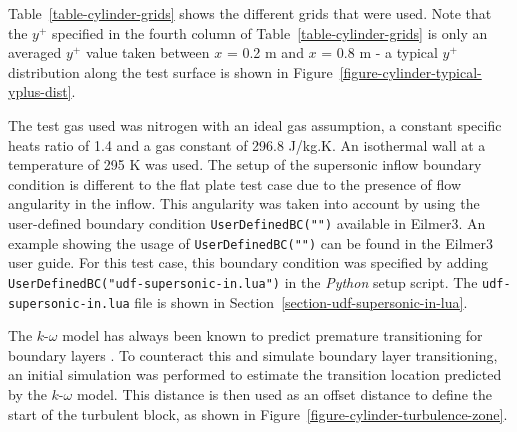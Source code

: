 Table~\ref{table-cylinder-grids} shows the different grids that were used.
Note that the $y^+$ specified in the fourth column of Table~\ref{table-cylinder-grids}
is only an averaged $y^+$ value taken between $x$ = 0.2 m and $x$ = 0.8 m
- a typical $y^+$ distribution along the test surface is shown in 
Figure~\ref{figure-cylinder-typical-yplus-dist}.

The test gas used was nitrogen with an ideal gas assumption, a 
constant specific heats ratio of 1.4 and a gas constant of 296.8 J/kg.K. 
An isothermal wall at a temperature of 295 K was used. 
The setup of the supersonic inflow boundary condition is different
to the flat plate test case due to the presence of flow angularity
in the inflow. This angularity was taken into account by using the 
user-defined boundary condition \texttt{UserDefinedBC("")} 
available in Eilmer3. An example showing the usage of \texttt{UserDefinedBC("")}
can be found in the Eilmer3 user guide. For this test case,
this boundary condition was specified by adding  \texttt{UserDefinedBC("udf-supersonic-in.lua")} 
in the \textit{Python} setup script. The \texttt{udf-supersonic-in.lua} file 
is shown in Section~\ref{section-udf-supersonic-in-lua}.

The $k$-$\omega$ model has always been known to predict premature
transitioning for boundary layers \cite{Wilcox2006}. To counteract this 
and simulate boundary layer transitioning, an initial simulation was
performed to estimate the transition location predicted by the 
$k$-$\omega$ model. This distance is then used as an offset distance 
to define the start of the turbulent block, as shown in 
Figure~\ref{figure-cylinder-turbulence-zone}.


%

